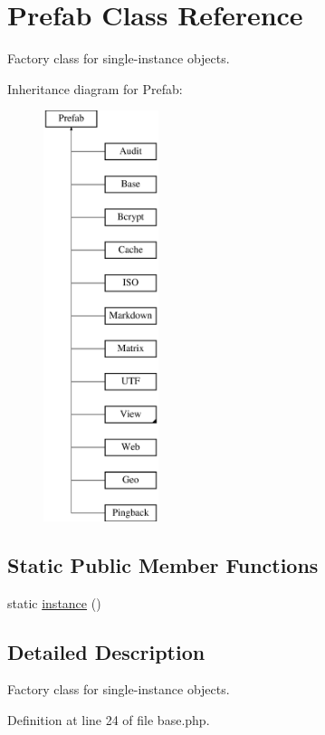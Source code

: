 \hypertarget{class_prefab}{}\section{Prefab Class Reference}
\label{class_prefab}


Factory class for single-\/instance objects.  


Inheritance diagram for Prefab\+:\begin{figure}[H]
\begin{center}
\leavevmode
\includegraphics[height=12.000000cm]{class_prefab}
\end{center}
\end{figure}
\subsection*{Static Public Member Functions}
\begin{DoxyCompactItemize}
\item 
static \hyperlink{class_prefab_a0deb004950b8dc4f51836316fd19c111}{instance} ()
\end{DoxyCompactItemize}


\subsection{Detailed Description}
Factory class for single-\/instance objects. 

Definition at line 24 of file base.\+php.



